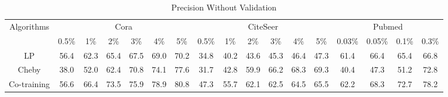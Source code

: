 \begin{table*}[htbp]
\setlength{\tabcolsep}{1.5pt}
  \centering
  \caption{Precision Without Validation}
  \scriptsize
    \begin{tabular}{c|cccccc|cccccc|cccc}
    \multirow{2}[1]{*}{Algorithms} & \multicolumn{6}{c|}{Cora}                     & \multicolumn{6}{c|}{CiteSeer}                 & \multicolumn{4}{c}{Pubmed} \\
          & 0.5\% & 1\%   & 2\%   & 3\%   & 4\%   & 5\%   & 0.5\% & 1\%   & 2\%   & 3\%   & 4\%   & 5\%   & 0.03\% & 0.05\% & 0.1\% & 0.3\% \\
    \midrule
    LP    & \cellcolor[rgb]{ .996,  .914,  .514}56.4 & \cellcolor[rgb]{ .992,  .78,  .49}62.3 & \cellcolor[rgb]{ .976,  .545,  .443}65.4 & \cellcolor[rgb]{ .973,  .412,  .42}67.5 & \cellcolor[rgb]{ .973,  .412,  .42}69.0 & \cellcolor[rgb]{ .973,  .412,  .42}70.2 & \cellcolor[rgb]{ .976,  .51,  .435}34.8 & \cellcolor[rgb]{ .973,  .412,  .42}40.2 & \cellcolor[rgb]{ .973,  .412,  .42}43.6 & \cellcolor[rgb]{ .973,  .412,  .42}45.3 & \cellcolor[rgb]{ .973,  .412,  .42}46.4 & \cellcolor[rgb]{ .973,  .412,  .42}47.3 & \cellcolor[rgb]{ .831,  .875,  .51}61.4 & \cellcolor[rgb]{ .831,  .875,  .51}66.4 & \cellcolor[rgb]{ .992,  .792,  .49}65.4 & \cellcolor[rgb]{ .973,  .412,  .42}66.8 \\
    Cheby & \cellcolor[rgb]{ .973,  .412,  .42}38.0 & \cellcolor[rgb]{ .973,  .412,  .42}52.0 & \cellcolor[rgb]{ .973,  .412,  .42}62.4 & \cellcolor[rgb]{ .98,  .584,  .451}70.8 & \cellcolor[rgb]{ .984,  .671,  .467}74.1 & \cellcolor[rgb]{ .992,  .788,  .49}77.6 & \cellcolor[rgb]{ .973,  .412,  .42}31.7 & \cellcolor[rgb]{ .973,  .482,  .431}42.8 & \cellcolor[rgb]{ .988,  .769,  .486}59.9 & \cellcolor[rgb]{ .996,  .855,  .502}66.2 & \cellcolor[rgb]{ .996,  .875,  .506}68.3 & \cellcolor[rgb]{ .996,  .882,  .51}69.3 & \cellcolor[rgb]{ .973,  .412,  .42}40.4 & \cellcolor[rgb]{ .973,  .412,  .42}47.3 & \cellcolor[rgb]{ .973,  .412,  .42}51.2 & \cellcolor[rgb]{ .984,  .694,  .471}72.8 \\
    Co-training & \cellcolor[rgb]{ 1,  .922,  .518}56.6 & \cellcolor[rgb]{ .984,  .918,  .518}66.4 & \cellcolor[rgb]{ .996,  .906,  .514}73.5 & \cellcolor[rgb]{ .996,  .855,  .502}75.9 & \cellcolor[rgb]{ 1,  .922,  .518}78.9 & \cellcolor[rgb]{ .886,  .89,  .514}80.8 & \cellcolor[rgb]{ 1,  .922,  .518}47.3 & \cellcolor[rgb]{ .992,  .843,  .502}55.7 & \cellcolor[rgb]{ .992,  .82,  .498}62.1 & \cellcolor[rgb]{ .992,  .776,  .486}62.5 & \cellcolor[rgb]{ .992,  .796,  .49}64.5 & \cellcolor[rgb]{ .992,  .8,  .494}65.5 & \cellcolor[rgb]{ .784,  .859,  .506}62.2 & \cellcolor[rgb]{ .675,  .827,  .502}68.3 & \cellcolor[rgb]{ .741,  .847,  .506}72.7 & \cellcolor[rgb]{ .871,  .886,  .514}78.2 \\

\end{tabular}
\end{table*}
